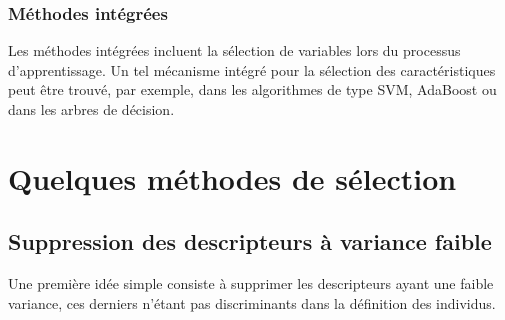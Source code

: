 \documentclass[letterpaper,10pt,english]{jupyterBook}
\begin{document}
\subsubsection{Méthodes intégrées}
\label{\detokenize{selection:methodes-integrees}}
\sphinxAtStartPar
Les méthodes intégrées incluent la sélection de variables lors du processus d’apprentissage. Un tel mécanisme intégré pour la sélection des caractéristiques peut être trouvé, par
exemple, dans les algorithmes de type SVM,  AdaBoost  ou dans les
arbres de décision.


\section{Quelques méthodes de sélection}
\label{\detokenize{selection:quelques-methodes-de-selection}}

\subsection{Suppression des descripteurs à variance faible}
\label{\detokenize{selection:suppression-des-descripteurs-a-variance-faible}}
\sphinxAtStartPar
Une première idée simple consiste à supprimer les descripteurs ayant une faible variance, ces derniers n’étant pas discriminants dans la définition des individus.
\end{document}
